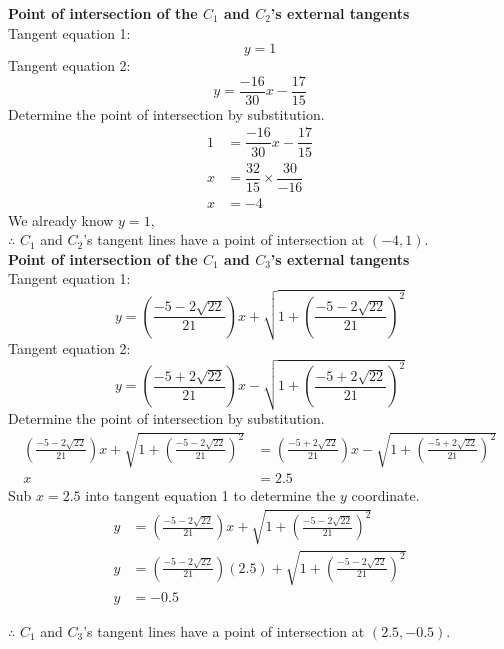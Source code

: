 \documentclass[12pt]{book}
\begin{document}
\begin{enumerate}

\textbf{Point of intersection of the $C_1$ and $C_2$'s external tangents}\\
Tangent equation 1: $$y=1$$
Tangent equation 2: $$y=\dfrac{-16}{30}x-\dfrac{17}{15}$$
Determine the point of intersection by substitution.
\begingroup
\addtolength{\jot}{0.5em}
\begin{align}
    1 &= \dfrac{-16}{30}x-\dfrac{17}{15}\\
    x &= \dfrac{32}{15} \times \dfrac{30}{-16} \\
    x &= -4
\end{align}
\endgroup
We already know $y=1$, \\

$\therefore$ $C_1$ and $C_2$'s tangent lines have a point of intersection at $(-4,1)$. \\


\textbf{Point of intersection of the $C_1$ and $C_3$'s external tangents}\\
Tangent equation 1: $$y=\left(\frac{-5-2\sqrt{22}}{21}\right)x+\sqrt{1+\left(\frac{-5-2\sqrt{22}}{21}\right)^{2}}$$
Tangent equation 2: $$y=\left(\frac{-5+2\sqrt{22}}{21}\right)x-\sqrt{1+\left(\frac{-5+2\sqrt{22}}{21}\right)^{2}}$$
Determine the point of intersection by substitution.
\begingroup
\addtolength{\jot}{0.5em}
\begin{align}
    \left(\frac{-5-2\sqrt{22}}{21}\right)x+\sqrt{1+\left(\frac{-5-2\sqrt{22}}{21}\right)^{2}} &= \left(\frac{-5+2\sqrt{22}}{21}\right)x-\sqrt{1+\left(\frac{-5+2\sqrt{22}}{21}\right)^{2}} \\
    x &= 2.5
\end{align}
\endgroup
Sub $x=2.5$ into tangent equation 1 to determine the $y$ coordinate.
\begin{align}
    y &= \left(\frac{-5-2\sqrt{22}}{21}\right)x+\sqrt{1+\left(\frac{-5-2\sqrt{22}}{21}\right)^{2}} \\
    y &= \left(\frac{-5-2\sqrt{22}}{21}\right)(2.5)+\sqrt{1+\left(\frac{-5-2\sqrt{22}}{21}\right)^{2}}\\
    y &= -0.5
\end{align}

$\therefore$ $C_1$ and $C_3$'s tangent lines have a point of intersection at $(2.5,-0.5)$. \\



\end{enumerate}
\end{document}
